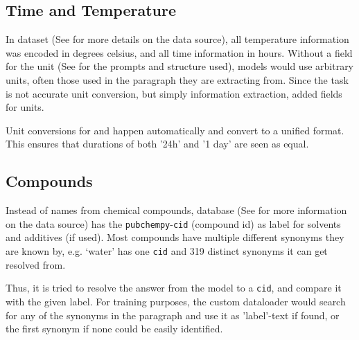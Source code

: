 \subsection{Time and Temperature}\label{sub:ttunit}
In  dataset (See  for more details on the data source), all temperature information was encoded in degrees celsius, and all time information in hours.
Without a field for the unit (See  for the prompts and structure used), models would use arbitrary units, often those used in the paragraph they are extracting from.
Since the task is not accurate unit conversion, but simply information extraction,  added fields for units.

Unit conversions for \ttemp and \ttime happen automatically and convert to a unified format. This ensures that durations of both '24h' and '1 day' are seen as equal.

\subsection{Compounds}\label{sub:compsolv}
Instead of names from chemical compounds,  database (See  for more information on the data source) has the \texttt{pubchempy}-\texttt{cid} (compound id) as label for solvents and additives (if used).
Most compounds have multiple different synonyms they are known by, e.g. `water' has one \texttt{cid} and 319 distinct synonyms it can get resolved from.

Thus, it is tried to resolve the answer from the model to a \texttt{cid}, and compare it with the given label.
For training purposes, the custom dataloader would search for any of the synonyms in the paragraph and use it as 'label'-text if found, or the first synonym if none could be easily identified.

